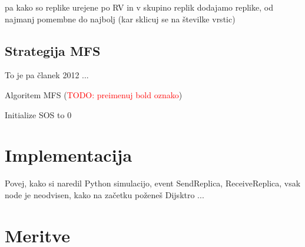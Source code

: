\documentclass[a4paper, 12pt]{book}
\newcommand{\TODO}[1]{\textcolor{red}{TODO: #1}}
\begin{document}
pa kako so replike urejene po RV in v skupino replik dodajamo replike,
od najmanj pomembne do najbolj (kar sklicuj se na številke vrstic)


\subsection{Strategija MFS}
To je pa članek 2012 ...


\begin{algorithm}[H]
  \label{alg:MFS}
  \caption{Algoritem MFS (\TODO{preimenuj bold oznako})}


  Initialize SOS to $0$\;
\end{algorithm}

\section{Implementacija}
Povej, kako si naredil Python simulacijo, event SendReplica, ReceiveReplica,
vsak node je neodvisen, kako na začetku poženeš Dijsktro ...

\section{Meritve}
\end{document}
